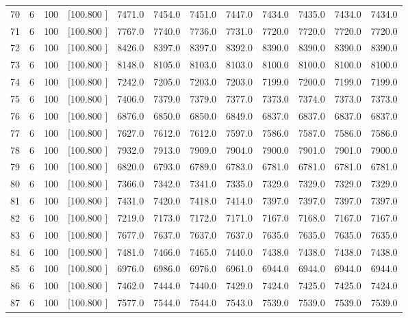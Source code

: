 \documentclass[12pt,a4paper]{article}
\begin{document}
\begin{center}
{\begin{tabular}{r r r r r r r r r r r r}
  70&  6&100&[100.800   ]&  7471.0&  7454.0&  7451.0&  7447.0&  7434.0&  7435.0&  7434.0&  7434.0\\[-0.02in]
  71&  6&100&[100.800   ]&  7767.0&  7740.0&  7736.0&  7731.0&  7720.0&  7720.0&  7720.0&  7720.0\\[-0.02in]
  72&  6&100&[100.800   ]&  8426.0&  8397.0&  8397.0&  8392.0&  8390.0&  8390.0&  8390.0&  8390.0\\[-0.02in]
  73&  6&100&[100.800   ]&  8148.0&  8105.0&  8103.0&  8103.0&  8100.0&  8100.0&  8100.0&  8100.0\\[-0.02in]
  74&  6&100&[100.800   ]&  7242.0&  7205.0&  7203.0&  7203.0&  7199.0&  7200.0&  7199.0&  7199.0\\[-0.02in]
  75&  6&100&[100.800   ]&  7406.0&  7379.0&  7379.0&  7377.0&  7373.0&  7374.0&  7373.0&  7373.0\\[-0.02in]
  76&  6&100&[100.800   ]&  6876.0&  6850.0&  6850.0&  6849.0&  6837.0&  6837.0&  6837.0&  6837.0\\[-0.02in]
  77&  6&100&[100.800   ]&  7627.0&  7612.0&  7612.0&  7597.0&  7586.0&  7587.0&  7586.0&  7586.0\\[-0.02in]
  78&  6&100&[100.800   ]&  7932.0&  7913.0&  7909.0&  7904.0&  7900.0&  7901.0&  7901.0&  7900.0\\[-0.02in]
  79&  6&100&[100.800   ]&  6820.0&  6793.0&  6789.0&  6783.0&  6781.0&  6781.0&  6781.0&  6781.0\\[-0.02in]
  80&  6&100&[100.800   ]&  7366.0&  7342.0&  7341.0&  7335.0&  7329.0&  7329.0&  7329.0&  7329.0\\[-0.02in]
  81&  6&100&[100.800   ]&  7431.0&  7420.0&  7418.0&  7414.0&  7397.0&  7397.0&  7397.0&  7397.0\\[-0.02in]
  82&  6&100&[100.800   ]&  7219.0&  7173.0&  7172.0&  7171.0&  7167.0&  7168.0&  7167.0&  7167.0\\[-0.02in]
  83&  6&100&[100.800   ]&  7677.0&  7637.0&  7637.0&  7637.0&  7635.0&  7635.0&  7635.0&  7635.0\\[-0.02in]
  84&  6&100&[100.800   ]&  7481.0&  7466.0&  7465.0&  7440.0&  7438.0&  7438.0&  7438.0&  7438.0\\[-0.02in]
  85&  6&100&[100.800   ]&  6976.0&  6986.0&  6976.0&  6961.0&  6944.0&  6944.0&  6944.0&  6944.0\\[-0.02in]
  86&  6&100&[100.800   ]&  7462.0&  7444.0&  7440.0&  7429.0&  7424.0&  7425.0&  7425.0&  7424.0\\[-0.02in]
  87&  6&100&[100.800   ]&  7577.0&  7544.0&  7544.0&  7543.0&  7539.0&  7539.0&  7539.0&  7539.0\\[-0.02in]

\end{tabular}}
\end{center}
\end{document}
